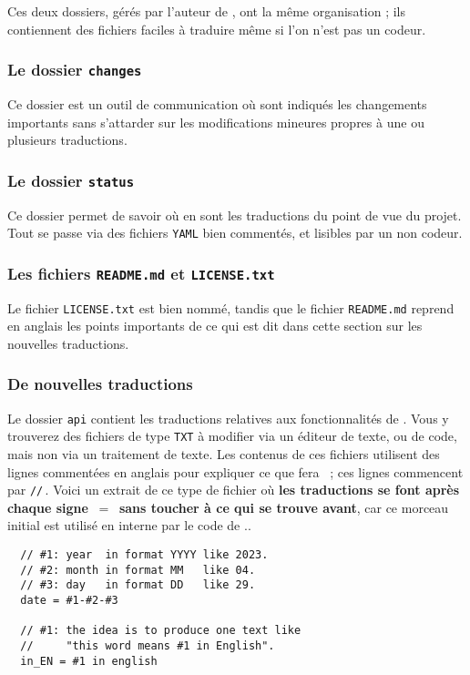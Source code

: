 Ces deux dossiers, gérés par l'auteur de \thisproj, ont la même organisation ; ils contiennent des fichiers faciles à traduire même si l'on n'est pas un codeur.


\subsubsection{Le dossier \texttt{changes}}

Ce dossier est un outil de communication où sont indiqués les changements importants sans s'attarder sur les modifications mineures propres à une ou plusieurs traductions.



\subsubsection{Le dossier \texttt{status}}

Ce dossier permet de savoir où en sont les traductions du point de vue du projet. Tout se passe via des fichiers \verb#YAML# bien commentés, et lisibles par un non codeur.



\subsubsection{Les fichiers \texttt{README.md} et \texttt{LICENSE.txt}}

Le fichier \texttt{LICENSE.txt} est bien nommé, tandis que le fichier \texttt{README.md} reprend en anglais les points importants de ce qui est dit dans cette section sur les nouvelles traductions.



\subsubsection{De nouvelles traductions}
\label{tutodoc-contrib-translate}

\begin{tdocimp}
    Le dossier \verb#api# contient les traductions relatives aux fonctionnalités de \thisproj.
    Vous y trouverez des fichiers de type \verb#TXT# à modifier via un éditeur de texte, ou de code, mais non via un traitement de texte.
    Les contenus de ces fichiers utilisent des lignes commentées en anglais pour expliquer ce que fera \thisproj\ ; ces lignes commencent par \verb#//#\,. Voici un extrait de ce type de fichier où \textbf{les traductions se font après chaque signe \,$=$\, sans toucher à ce qui se trouve avant}, car ce morceau initial est utilisé en interne par le code de \thisproj..

    \tdocsep
    \vspace{-10pt}
    \begin{verbatim}
  // #1: year  in format YYYY like 2023.
  // #2: month in format MM   like 04.
  // #3: day   in format DD   like 29.
  date = #1-#2-#3

  // #1: the idea is to produce one text like
  //     "this word means #1 in English".
  in_EN = #1 in english\end{verbatim}
\end{tdocimp}


